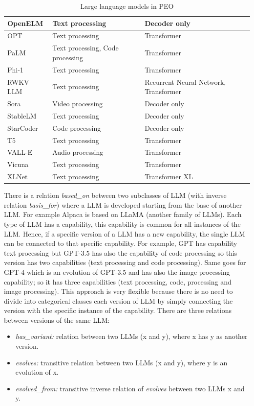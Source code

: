 \begin{table}[H]
\begin{tabular}{|>{\raggedright\arraybackslash}p{4cm}|>{\raggedright\arraybackslash}p{4cm}|>{\raggedright\arraybackslash}p{4cm}|}
        OpenELM & Text processing & Decoder only \\ \hline
        OPT & Text processing & Transformer \\ \hline
        PaLM & Text processing, Code processing & Transformer \\ \hline
        Phi-1 & Text processing & Transformer \\ \hline
        RWKV LLM & Text processing & Recurrent Neural Network, Transformer \\ \hline
        Sora & Video processing & Decoder only \\ \hline
        StableLM & Text processing & Decoder only \\ \hline
        StarCoder & Code processing & Decoder only \\ \hline
        T5 & Text processing & Transformer \\ \hline
        VALL-E & Audio processing & Transformer \\ \hline
        Vicuna & Text processing & Transformer \\ \hline
        XLNet & Text processing & Transformer XL \\ \hline
    \end{tabular}
    \caption{Large language models in PEO}
\end{table}
There is a relation \textit{based\_on} between two subclasses of LLM (with inverse relation \textit{basis\_for}) where a LLM is developed starting from the base of another LLM.
For example Alpaca is based on LLaMA (another family of LLMs).
Each type of LLM has a capability, this capability is common for all instances of the LLM.
Hence, if a specific version of a LLM has a new capability, the single LLM can be connected to that specific capability. For example, GPT has capability text processing but GPT-3.5 has also the capability of code processing so this version has two capabilities (text processing and code processing).
Same goes for GPT-4 which is an evolution of GPT-3.5 and has also the image processing capability; so it has three capabilities (text processing, code, processing and image processing).
This approach is very flexible because there is no need to divide into categorical classes each version of LLM by simply connecting the version with the specific instance of the capability.
There are three relations between versions of the same LLM: 
\begin{itemize}
    \item \textit{has\_variant:} relation between two LLMs (x and y), where x has y as another version.

    \item \textit{evolves:} transitive relation between two LLMs (x and y), where y is an evolution of x. 

    \item \textit{evolved\_from:} transitive inverse relation of \textit{evolves} between two LLMs x and y.
\end{itemize}

